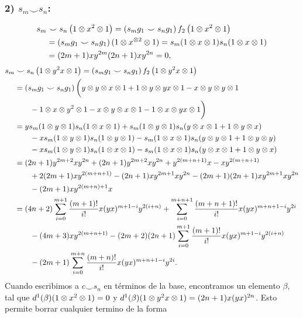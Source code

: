 \documentclass[fleqn,../tesis.tex]{subfiles}
\begin{document}
\subsubsection{2) $s_m \smile s_n$:}
\begin{align*}
	s_m &\smile s_n\left(1\otimes x^{2} \otimes 1\right) = \left(s_m g_1 \smile s_n g_1\right)f_2\left(1\otimes x^2 \otimes 1\right)\\
	&= \left(s_m g_1 \smile s_n g_1\right)(1 \otimes x^{\otimes 2}\otimes 1) = s_m(1\otimes x \otimes 1)s_n(1 \otimes x \otimes 1)\\
	&= (2m + 1)xy^{2m} (2n + 1)xy^{2n} = 0,
\end{align*}
\begin{align*}
	s_m &\smile s_n\left(1\otimes y^2x \otimes 1\right) = \left(s_m g_1 \smile s_n g_1\right)f_2\left(1\otimes y^2x \otimes 1\right)\\
	&= \left(s_m g_1 \smile s_n g_1\right)\bigg(y \otimes y \otimes x \otimes 1 + 1 \otimes y \otimes yx \otimes 1 
		- x \otimes y \otimes y \otimes 1\\ &\qquad - 1\otimes x \otimes y^2 \otimes 1 - x \otimes y \otimes x \otimes 1 
		- 1\otimes x \otimes yx \otimes 1\bigg) \\
	&= y s_m(1 \otimes y \otimes 1)s_n(1 \otimes x \otimes 1) + s_m(1\otimes y \otimes 1)s_n(y \otimes x \otimes 1 + 1 \otimes y \otimes x)\\
	&\qquad -xs_m(1\otimes y \otimes 1)s_n(1 \otimes y \otimes 1) -s_m(1\otimes x \otimes 1)s_n(y \otimes y \otimes 1 + 1\otimes y \otimes y)\\
	&\qquad -xs_m(1\otimes y \otimes 1)s_n(1 \otimes x \otimes 1) -s_m(1\otimes x \otimes 1)s_n(y \otimes x \otimes 1 + 1\otimes y \otimes x)\\
	&= (2n + 1)y^{2m + 2}xy^{2n} + (2n + 1)y^{2m + 2}xy^{2n} + y^{2(m + n + 1)}x - xy^{2(m + n + 1)}\\
	&\qquad + 2(2m + 1)xy^{2(m + n + 1)} - (2n + 1)xy^{2m + 1}xy^{2n} - (2m + 1)(2n + 1)xy^{2m + 1}xy^{2n}\\
	&\qquad -(2m + 1)xy^{2(m + n) + 1}x\\
	&=(4n + 2)\sum_{i = 0}^{m + 1}\frac{(m + 1)!}{i!}x(yx)^{m + 1 - i}y^{2(i + n)}
		+\sum_{i = 0}^{m + n + 1}\frac{(m + n + 1)!}{i!}x(yx)^{m + n + 1 - i}y^{2i}\\
	&\qquad -(4m + 3)xy^{2(m + n + 1)}
		- (2m + 2)(2n + 1)\sum_{i = 0}^{m + 1}\frac{(m + 1)!}{i!}x(yx)^{m + 1 - i}y^{2(i + n)}\\
	&\qquad -(2m + 1)\sum_{i = 0}^{m + n}\frac{(m + n)!}{i!}x(yx)^{m + n + 1 - i}y^{2i}.
\end{align*}
Cuando escribimos a $c\smile s_n$ en términos de la base, encontramos un elemento
$\beta$, tal que $d^1(\beta)(1\otimes x^2\otimes 1) = 0$
y $d^1(\beta)(1\otimes y^2x\otimes 1) = (2n + 1)x(yx)^{2n}$. Esto permite borrar cualquier termino de la forma
\end{document}
